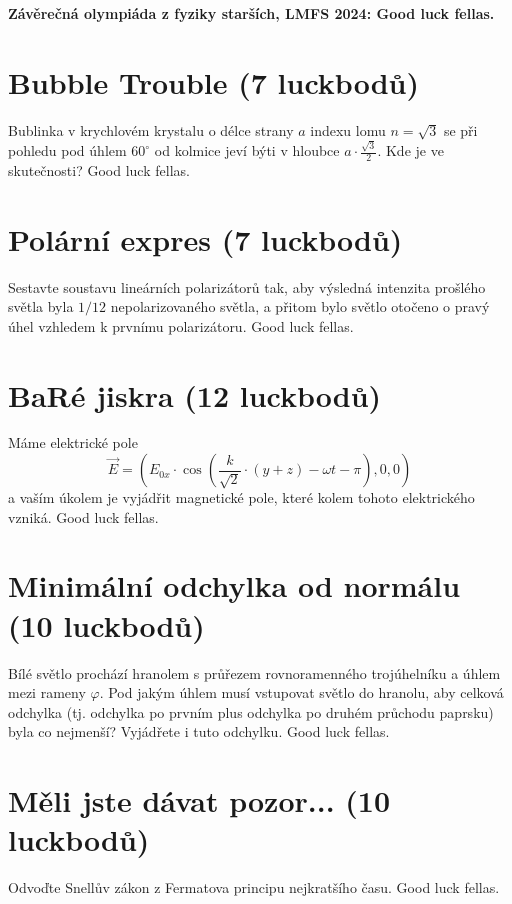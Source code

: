 \documentclass[11pt,a4paper,landscape]{article}
\author{Tomáš Dolák}
\begin{document}
\pagestyle{empty}
\textbf{\center\LARGE Závěrečná olympiáda z fyziky starších, LMFS 2024: Good luck fellas.}
\vfill

\begin{multicols}{2}[]

\section{Bubble Trouble (7 luckbodů)}
Bublinka v krychlovém krystalu o délce strany $a$ indexu lomu $n=\sqrt{3}$ se při pohledu pod úhlem $60^\circ$ od kolmice jeví býti v hloubce $a\cdot\frac{\sqrt{3}}{2}$. Kde je ve skutečnosti? Good luck fellas.

\section{Polární expres (7 luckbodů)}
Sestavte soustavu lineárních polarizátorů tak, aby výsledná intenzita prošlého světla byla $1/12$ nepolarizovaného světla, a přitom bylo světlo otočeno o pravý úhel vzhledem k prvnímu polarizátoru. Good luck fellas.

\section{BaRé jiskra (12 luckbodů)}
Máme elektrické pole 
\begin{equation}
\vec{E} = \left(E_{0x}\cdot\cos\left(\frac{k}{\sqrt{2}}\cdot\left(y+z\right) - \omega t - \pi\right),0,0\right)
\end{equation}
a vaším úkolem je vyjádřit magnetické pole, které kolem tohoto elektrického vzniká. Good luck fellas.

\section{Minimální odchylka od normálu (10 luckbodů)}
Bílé světlo prochází hranolem s průřezem rovnoramenného trojúhelníku a úhlem mezi rameny $\varphi$. Pod jakým úhlem musí vstupovat světlo do hranolu, aby celková odchylka (tj. odchylka po prvním plus odchylka po druhém průchodu paprsku) byla co nejmenší? Vyjádřete i tuto odchylku. Good luck fellas.

\section{Měli jste dávat pozor... (10 luckbodů)}
Odvoďte Snellův zákon z Fermatova principu nejkratšího času. Good luck fellas.


\end{multicols}
\end{document}
